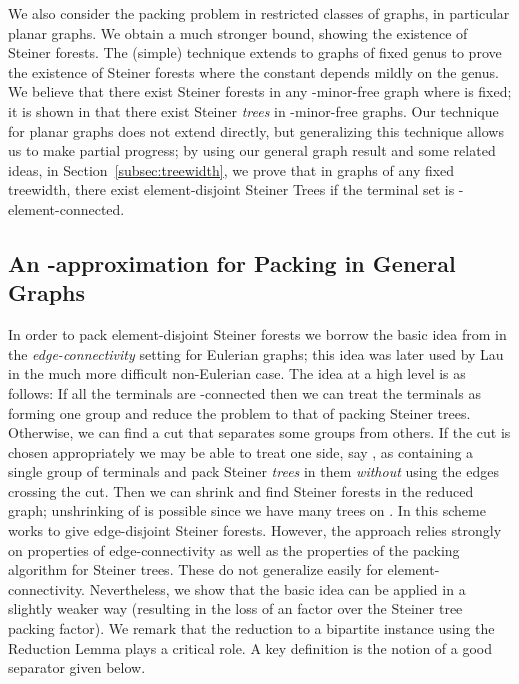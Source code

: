 \documentclass[11pt]{article}
\begin{document}
We also consider the packing problem in restricted classes of graphs,
in particular planar graphs. We obtain a much stronger bound, showing
the existence of  Steiner forests. The (simple)
technique extends to graphs of fixed genus to prove the existence of
 Steiner forests where the constant depends mildly on the
genus. We believe that there exist  Steiner forests in any
-minor-free graph where  is fixed; it is shown in \cite{ACJ08}
that there exist  Steiner \emph{trees} in -minor-free
graphs. Our technique for planar graphs does not extend directly, but
generalizing this technique allows us to make partial progress; by
using our general graph result and some related ideas, in
Section~\ref{subsec:treewidth}, we prove that in graphs of any fixed
treewidth, there exist  element-disjoint Steiner Trees if
the terminal set is -element-connected.

\subsection{An -approximation for Packing
in General Graphs}\label{subsec:generalPacking}

In order to pack element-disjoint Steiner forests we borrow the basic
idea from \cite{ChekuriS} in the {\em edge-connectivity} setting for
Eulerian graphs; this idea was later used by Lau \cite{Lau2} in the
much more difficult non-Eulerian case. The idea at a high level is as
follows: If all the terminals are -connected then we can treat the
terminals as forming one group and reduce the problem to that of
packing Steiner trees. Otherwise, we can find a cut  that separates some groups from others. If the cut is chosen
appropriately we may be able to treat one side, say , as containing
a single group of terminals and pack Steiner {\em trees} in them {\em
  without} using the edges crossing the cut. Then we can shrink 
and find Steiner forests in the reduced graph; unshrinking of  is
possible since we have many trees on . In \cite{ChekuriS,Lau2} this
scheme works to give  edge-disjoint Steiner forests.
However, the approach relies strongly on properties of
edge-connectivity as well as the properties of the packing algorithm
for Steiner trees. These do not generalize easily for
element-connectivity. Nevertheless, we show that the basic idea can be
applied in a slightly weaker way (resulting in the loss of an  factor over the Steiner tree packing factor). We remark that the
reduction to a bipartite instance using the Reduction Lemma plays a
critical role. A key definition is the notion of a good separator
given below.
\end{document}
